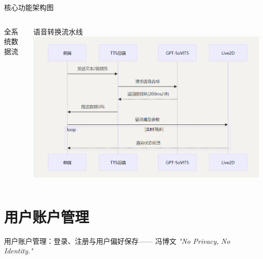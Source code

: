 \documentclass{beamer}
\begin{document}
\begin{frame}{核心功能架构图}
\begin{columns}[T]
\begin{column}{0.5\textwidth}
\begin{block}{全系统数据流}
            \end{block}
        \end{column}
        \begin{column}{0.5\textwidth}
            \begin{block}{语音转换流水线}
                \includegraphics[width=\linewidth]{pic/voice_pipeline.png}
            \end{block}
        \end{column}
    \end{columns}
\end{frame}



\section{用户账户管理}

\begin{frame}{用户账户管理：登录、注册与用户偏好保存\hfill  —— 冯博文}
    \centering
    \textit{"No Privacy, No Identity."} \\
    \vspace {1em}
\end{frame}
\end{document}
